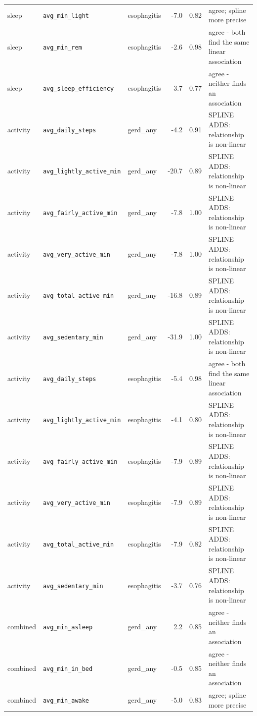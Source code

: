 \documentclass[11pt]{article}
\newcommand{\code}[1]{\texttt{\small #1}}
\begin{document}
\begin{longtable}{@{}p{2.0cm}p{3.4cm}p{2.4cm}rr p{3.2cm}@{}}
sleep & \code{avg\_min\_light} & esophagitis & -7.0 & 0.82 & agree; spline more precise \\
sleep & \code{avg\_min\_rem} & esophagitis & -2.6 & 0.98 & agree - both find the same linear association \\
sleep & \code{avg\_sleep\_efficiency} & esophagitis & 3.7 & 0.77 & agree - neither finds an association \\
activity & \code{avg\_daily\_steps} & gerd\_any & -4.2 & 0.91 & SPLINE ADDS: relationship is non-linear \\
activity & \code{avg\_lightly\_active\_min} & gerd\_any & -20.7 & 0.89 & SPLINE ADDS: relationship is non-linear \\
activity & \code{avg\_fairly\_active\_min} & gerd\_any & -7.8 & 1.00 & SPLINE ADDS: relationship is non-linear \\
activity & \code{avg\_very\_active\_min} & gerd\_any & -7.8 & 1.00 & SPLINE ADDS: relationship is non-linear \\
activity & \code{avg\_total\_active\_min} & gerd\_any & -16.8 & 0.89 & SPLINE ADDS: relationship is non-linear \\
activity & \code{avg\_sedentary\_min} & gerd\_any & -31.9 & 1.00 & SPLINE ADDS: relationship is non-linear \\
activity & \code{avg\_daily\_steps} & esophagitis & -5.4 & 0.98 & agree - both find the same linear association \\
activity & \code{avg\_lightly\_active\_min} & esophagitis & -4.1 & 0.80 & SPLINE ADDS: relationship is non-linear \\
activity & \code{avg\_fairly\_active\_min} & esophagitis & -7.9 & 0.89 & SPLINE ADDS: relationship is non-linear \\
activity & \code{avg\_very\_active\_min} & esophagitis & -7.9 & 0.89 & SPLINE ADDS: relationship is non-linear \\
activity & \code{avg\_total\_active\_min} & esophagitis & -7.9 & 0.82 & SPLINE ADDS: relationship is non-linear \\
activity & \code{avg\_sedentary\_min} & esophagitis & -3.7 & 0.76 & SPLINE ADDS: relationship is non-linear \\
combined & \code{avg\_min\_asleep} & gerd\_any & 2.2 & 0.85 & agree - neither finds an association \\
combined & \code{avg\_min\_in\_bed} & gerd\_any & -0.5 & 0.85 & agree - neither finds an association \\
combined & \code{avg\_min\_awake} & gerd\_any & -5.0 & 0.83 & agree; spline more precise \\

\end{longtable}
\end{document}
